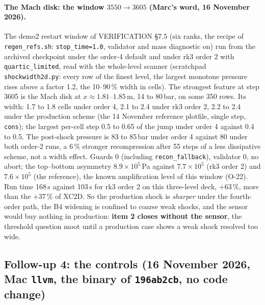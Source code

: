 \documentclass[11pt,a4paper]{article}
\newcommand{\code}[1]{\texttt{\small #1}}
\begin{document}
\paragraph{The Mach disk: the window $3550 \to 3605$ (Marc's word, 16 November 2026).}
The demo2 restart window of VERIFICATION \S7.5 (six ranks, the recipe of
\code{regen\_refs.sh}: \code{stop\_time=1.0}, validator and mass
diagnostic on) run from the archived checkpoint under the order-4
default and under rk3 order 2 with \code{quartic\_limited}, read with
the whole-level scanner (scratchpad \code{shockwidth2d.py}: every row of
the finest level, the largest monotone pressure rises above a factor
1.2, the 10--90\,\% width in cells).  The strongest feature at step
3605 is the Mach disk at $x \approx 1.81$--$1.85$\,m, 14 to 80\,bar, on
some 350 rows.  Its width: 1.7 to 1.8 cells under order 4, 2.1 to 2.4
under rk3 order 2, 2.2 to 2.4 under the production scheme (the 14
November reference plotfile, single step, \code{cons}); the largest
per-cell step 0.5 to 0.65 of the jump under order 4 against 0.4 to 0.5.
The post-shock pressure is 83 to 85\,bar under order 4 against 80 under
both order-2 runs, a 6\,\% stronger recompression after 55 steps of a
less dissipative scheme, not a width effect.  Guards 0 (including
\code{recon\_fallback}), validator 0, no abort; the top--bottom
asymmetry $8.9\times10^{5}$\,Pa against $7.7\times10^{5}$ (rk3 order 2)
and $7.6\times10^{5}$ (the reference), the known amplification level of
this window (O-22).  Run time 168\,s against 103\,s for rk3 order 2 on
this three-level deck, $+63\,\%$, more than the $+37\,\%$ of XC2D.
So the production shock is \emph{sharper} under the fourth-order path,
the B4 widening is confined to coarse weak shocks, and the sensor would
buy nothing in production: \textbf{item 2 closes without the sensor}, the
threshold question moot until a production case shows a weak shock
resolved too wide.


\subsection{Follow-up 4: the controls (16 November 2026, Mac \code{llvm}, the binary of \code{196ab2cb}, no code change)}
\label{sec:fu4ctl}
\end{document}
